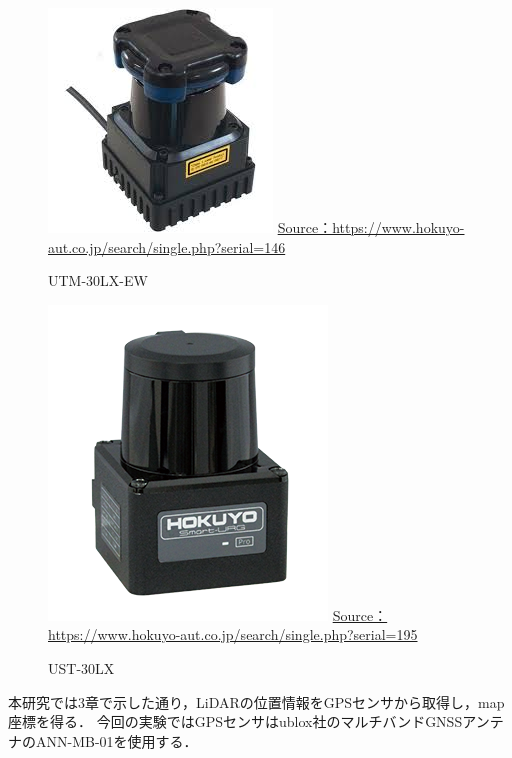 \documentclass[autodetect-engine,dvipdfmx-if-dvi,ja=standard,a4j,jbase=11pt,magstyle=nomag*]{bxjsreport}
\begin{document}
\begin{figure}[p]
    \centering
    \includegraphics[width=0.5\linewidth, clip]{./figure/chapter4/lidar1.jpg}
    \url{Source：https://www.hokuyo-aut.co.jp/search/single.php?serial=146}
    \caption{UTM-30LX-EW}
    \label{fig:lidar1}
\end{figure}

\begin{figure}[p]
    \centering
    \includegraphics[width=0.5\linewidth, clip]{./figure/chapter4/lidar2.png}
    \url{Source：https://www.hokuyo-aut.co.jp/search/single.php?serial=195}
    \caption{UST-30LX}
    \label{fig:lidar2}
\end{figure}

本研究では3章で示した通り，LiDARの位置情報をGPSセンサから取得し，map座標を得る．
今回の実験ではGPSセンサはublox社のマルチバンドGNSSアンテナのANN-MB-01を使用する．
\end{document}
